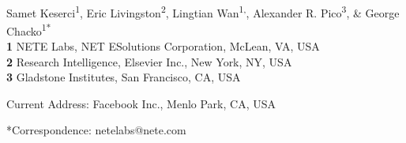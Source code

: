 \documentclass[10pt,letterpaper]{article}
\date{}
\begin{document}
\vspace*{0.2in}

\begin{flushleft}
{\Large
\textbf{} %
}
\newline
\\
Samet Keserci\textsuperscript{1},
Eric Livingston\textsuperscript{2},
Lingtian Wan\textsuperscript{1,\textcurrency},
Alexander R. Pico\textsuperscript{3},
 \& George Chacko\textsuperscript{1*}
\\
\bigskip
\textbf{1} NETE Labs, NET ESolutions Corporation, McLean, VA, USA
\\
\textbf{2} Research Intelligence, Elsevier Inc., New York, NY, USA
\\
\textbf{3} Gladstone Institutes, San Francisco, CA, USA
\\
\bigskip


% 
%


\textcurrency Current Address: Facebook Inc., Menlo Park, CA, USA %



*Correspondence: netelabs@nete.com
\end{flushleft}
\end{document}
